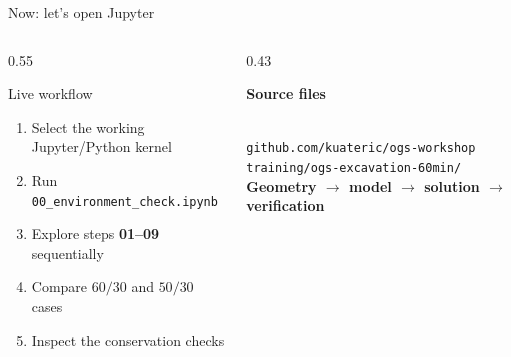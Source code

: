 \documentclass[aspectratio=169,10pt]{beamer}
\newcommand{\pill}[1]{\colorbox{teclight}{\strut\hspace{0.08cm}\textcolor{tecblue}{\textbf{#1}}\hspace{0.08cm}}}
\begin{document}
\begin{frame}{Now: let's open Jupyter}
\begin{columns}[T,onlytextwidth]
\begin{column}{0.55\textwidth}
\begin{block}{Live workflow}\small\begin{enumerate}\item Select the working Jupyter/Python kernel\item Run \texttt{00\_environment\_check.ipynb}\item Explore steps \textbf{01--09} sequentially\item Compare $60/30$ and $50/30$ cases\item Inspect the conservation checks\end{enumerate}\end{block}
\end{column}
\begin{column}{0.43\textwidth}
\vspace{0.22cm}
\pill{Source files}\\[0.35cm]
\texttt{github.com/kuateric/ogs-workshop}\\[0.22cm]
\small \texttt{training/ogs-excavation-60min/}\\[0.46cm]
\color{tecblue}\large\bfseries Geometry $\to$ model $\to$ solution $\to$ verification
\end{column}
\end{columns}
\end{frame}
\end{document}
